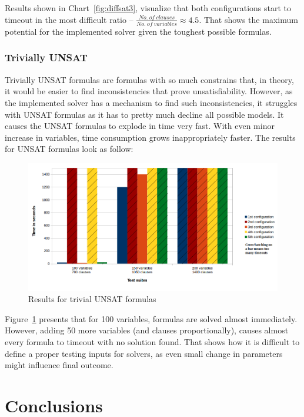 \documentclass[12pt,english,pdflatex]{aghdpl}
\begin{document}
Results shown in Chart~\ref{fig:diffsat3}, visualize that both configurations start to timeout in the most difficult ratio -- $\frac{No.\ of\ clauses}{No.\ of\ variables} \approx 4.5$. That shows the maximum potential for the implemented solver given the toughest possible formulas.

\subsection{Trivially UNSAT}
\label{subsec:TrivialUnsat}
Trivially UNSAT formulas are formulas with so much constrains that, in theory, it would be easier to find inconsistencies that prove unsatisfiability. However, as the implemented solver has a mechanism to find such inconsistencies, it struggles with UNSAT formulas as it has to pretty much decline all possible models. It causes the UNSAT formulas to explode in time very fast. With even minor increase in variables, time consumption grows inappropriately faster. The results for UNSAT formulas look as follow:

\begin{figure}[H]
\begin{centering}
\includegraphics[scale=0.62]{charts/trivial_unsat}
\par\end{centering}
\caption{Results for trivial UNSAT formulas}
\label{fig:trvunsat}
\end{figure}
Figure~\ref{fig:trvunsat} presents that for 100 variables, formulas are solved almost immediately. However, adding 50 more variables (and clauses proportionally), causes almost every formula to timeout with no  solution found. That shows how it is difficult to define a proper testing inputs for solvers, as even small change in parameters might influence final outcome.

\chapter{Conclusions}
\label{chap:Conclusions}
\end{document}
